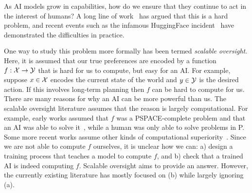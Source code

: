 As AI models grow in capabilities, how do we ensure that they continue to act in the interest of humans? A long line of work~\citep{yudkowsky2008artificial,soares2015corrigibility,russell2015research,amodei2016concrete,everitt2017corrupted,soares2017agent,armstrong2018occam,soares2018value,hubinger2019risks,taylor2020alignment,skalse2022reward} has argued that this is a hard problem, and recent events such as the infamous HuggingFace incident~\citep{openai2026huggingface} have demonstrated the difficulties in practice. 

One way to study this problem more formally has been termed \emph{scalable oversight}. Here, it is assumed that our true preferences are encoded by a function $f: {\mathcal X} \rightarrow {\mathcal Y}$ that is hard for us to compute, but easy for an AI. For example, suppose $x \in {\mathcal X}$ encodes the current state of the world and $y \in {\mathcal Y}$ is the desired action. If this involves long-term planning then $f$ can be hard to compute for us. There are many reasons for why an AI can be more powerful than us. The scalable oversight literature assumes that the reason is largely computational. For example, early works assumed that $f$ was a PSPACE-complete problem and that an AI was able to solve it~\citep{irving2018debate}, while a human was only able to solve problems in P. Some more recent works assume other kinds of computational superiority~\citep{browncohen2024debate,browncohen2025prover}. Since we are not able to compute $f$ ourselves, it is unclear how we can: a) design a training process that teaches a model to compute $f$, and b) check that a trained AI is indeed computing $f$. Scalable oversight aims to provide an answer. However, the currently existing literature has mostly focused on (b) while largely ignoring (a). 

